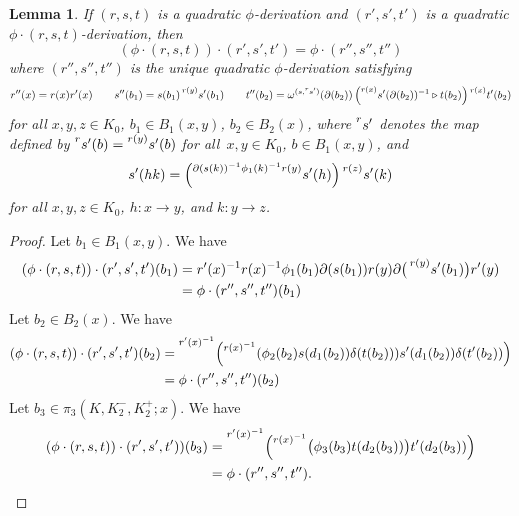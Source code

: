 \documentclass[10pt,a4paper]{amsart}
\newtheorem{lem}{Lemma}
\begin{document}
\begin{lem}\label{Lemma composition}
If $(r,s,t)$ is a quadratic $\phi$-derivation and $(r',s',t')$ is a quadratic $\phi\cdot (r,s,t)$-derivation, then
$$
(\phi\cdot (r,s,t))\cdot (r',s',t') = \phi \cdot (r'', s'', t'')
$$
where $(r'', s'', t'')$ is the unique quadratic $\phi$-derivation satisfying
$$
r''(x) = r(x)r'(x)\quad \quad s''(b_1) = s(b_1)\prescript{r(y)}{}{s'(b_1)}\quad \quad t''(b_2) = \omega^{(s, \prescript{r}{}{s'})}(\partial (b_2)) \left(\prescript{r(x)}{}{s'(\partial (b_2))^{-1}}\triangleright t(b_2)\right)\prescript{r(x)}{}{t'(b_2)}
$$
for all $x,y,z \in K_0$, $b_1\in B_1(x,y)$, $b_2 \in B_2(x)$, where $\prescript{r}{}{s'}$ denotes the map defined by $\prescript{r}{}{s'}(b) = \prescript{r(y)}{}{s'(b)}$ for all~$x,y\in K_0$, $b\in B_1(x,y)$, and 
$$
s'(hk) =\left( \prescript{\partial (s(k))^{-1}\phi_1(k)^{-1}r(y)}{}{s'(h)}\right)\prescript{r(z)}{}{s'(k)}
$$
for all $x,y, z\in K_0$, $h\colon x\to y$, and $k\colon y\to z$. 
\end{lem}

\begin{proof}
Let $b_1\in B_1(x,y)$. We have
\begin{align*}
(\phi\cdot (r,s,t) )\cdot (r',s',t') (b_1) &= r'(x)^{-1}r(x)^{-1}\phi_1(b_1)\partial (s(b_1)) r(y)\partial \big(\prescript{r(y)}{}{s'(b_1)}\big)r'(y)\\
&= \phi\cdot (r'', s'', t'')(b_1)
\end{align*}
Let $b_2 \in B_2(x)$. We have
\begin{align*}
(\phi\cdot (r,s,t))\cdot (r',s',t') (b_2) &= \prescript{r'(x)^{-1}}{}{\left(\prescript{r(x)^{-1}}{}{\left(\phi_2(b_2)s(d_1 (b_2))\delta (t(b_2))\right)}s'(d_1 (b_2))\delta (t'(b_2))\right) }\\
&= \phi \cdot (r'', s'', t'')(b_2)
\end{align*}
Let $b_3 \in \pi_3(K, K_2^-, K_2^+; x)$. We have
\begin{align*}
(\phi\cdot (r,s,t))\cdot (r',s',t'))(b_3) &= \prescript{r'(x)^{-1}}{}{\left(\prescript{r(x)^{-1}}{}{\big (}\phi_3(b_3) t(d_2 (b_3))\big ) t'(d_2 (b_3))\right)}\\
&= \phi \cdot (r'', s'', t'').\qedhere
\end{align*}
\end{proof}
\end{document}
